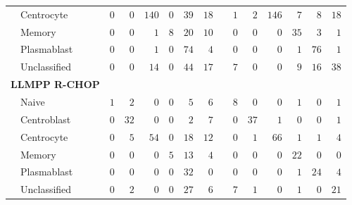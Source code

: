 \begin{table}[!tbp]
\begin{adjustwidth}{-0.75in}{0in}
{\begin{center}
\begin{tabular}{lrrrrrrcrrrrrr}
~~Centrocyte&$0$&$ 0$&$140$&$0$&$39$&$18$&&$ 1$&$ 2$&$146$&$ 7$&$ 8$&$18$\tabularnewline
~~Memory&$0$&$ 0$&$  1$&$8$&$20$&$10$&&$ 0$&$ 0$&$  0$&$35$&$ 3$&$ 1$\tabularnewline
~~Plasmablast&$0$&$ 0$&$  1$&$0$&$74$&$ 4$&&$ 0$&$ 0$&$  0$&$ 1$&$76$&$ 1$\tabularnewline
~~Unclassified&$0$&$ 0$&$ 14$&$0$&$44$&$17$&&$ 7$&$ 0$&$  0$&$ 9$&$16$&$38$\tabularnewline
\hline
{\bfseries LLMPP R-CHOP}&&&&&&&&&&&&&\tabularnewline
~~Naive&$1$&$ 2$&$  0$&$0$&$ 5$&$ 6$&&$ 8$&$ 0$&$  0$&$ 1$&$ 0$&$ 1$\tabularnewline
~~Centroblast&$0$&$32$&$  0$&$0$&$ 2$&$ 7$&&$ 0$&$37$&$  1$&$ 0$&$ 0$&$ 1$\tabularnewline
~~Centrocyte&$0$&$ 5$&$ 54$&$0$&$18$&$12$&&$ 0$&$ 1$&$ 66$&$ 1$&$ 1$&$ 4$\tabularnewline
~~Memory&$0$&$ 0$&$  0$&$5$&$13$&$ 4$&&$ 0$&$ 0$&$  0$&$22$&$ 0$&$ 0$\tabularnewline
~~Plasmablast&$0$&$ 0$&$  0$&$0$&$32$&$ 0$&&$ 0$&$ 0$&$  0$&$ 1$&$24$&$ 4$\tabularnewline
~~Unclassified&$0$&$ 2$&$  0$&$0$&$27$&$ 6$&&$ 7$&$ 1$&$  0$&$ 1$&$ 0$&$21$\tabularnewline
\hline
\end{tabular}\end{center}}
\end{adjustwidth}
\end{table}
